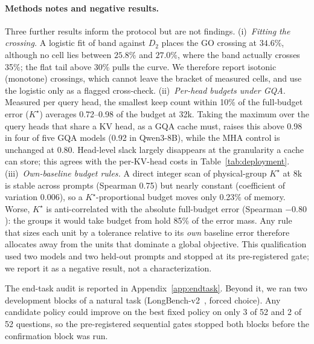 \paragraph{Methods notes and negative results.}
Three further results inform the protocol but are not findings.
(i)~\emph{Fitting the crossing.}  A logistic fit of band against $D_2$ places the
GO crossing at $34.6\%$, although no cell lies between $25.8\%$ and $27.0\%$,
where the band actually crosses 35\%; the flat tail above 30\% pulls the curve.
We therefore report isotonic (monotone) crossings, which cannot leave the
bracket of measured cells, and use the logistic only as a flagged cross-check.
(ii)~\emph{Per-head budgets under GQA.}  Measured per query head, the smallest
keep count within 10\% of the full-budget error ($K^\star$) averages 0.72--0.98
of the budget at 32k.  Taking the maximum over the query heads that share a KV
head, as a GQA cache must, raises this above 0.98 in four of five GQA models
(0.92 in Qwen3-8B), while the MHA control is unchanged at 0.80.  Head-level slack
largely disappears at the granularity a cache can store; this agrees with the
per-KV-head costs in Table~\ref{tab:deployment}.
(iii)~\emph{Own-baseline budget rules.}  A direct integer scan of physical-group
$K^\star$ at 8k is stable across prompts (Spearman 0.75) but nearly constant
(coefficient of variation 0.006), so a $K^\star$-proportional budget moves only
0.23\% of memory.  Worse, $K^\star$ is anti-correlated with the absolute
full-budget error (Spearman $-0.80$): the groups it would take budget from hold
85\% of the error mass.  Any rule that sizes each unit by a tolerance relative
to its \emph{own} baseline error therefore allocates away from the units that
dominate a global objective.  This qualification used two models and two
held-out prompts and stopped at its pre-registered gate; we report it as a
negative result, not a characterization.

The end-task audit is reported in Appendix~\ref{app:endtask}.  Beyond it, we
ran two development blocks of a natural task (LongBench-v2~\citep{bai2025longbenchv2},
forced choice).  Any candidate policy could improve on the best fixed policy on
only 3 of 52 and 2 of 52 questions, so the pre-registered sequential gates
stopped both blocks before the confirmation block was run.


